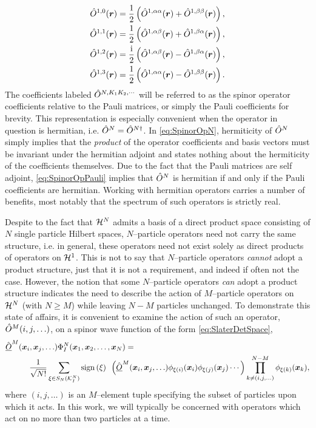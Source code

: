 \begin{subequations}
\begin{align}
&\hat{O}^{1,0}(\boldsymbol{r}) = \frac{1}{2} \left( \hat{O}^{1,\alpha\alpha}(\boldsymbol{r}) + \hat{O}^{1,\beta\beta}(\boldsymbol{r}) \right),\\
&\hat{O}^{1,1}(\boldsymbol{r}) = \frac{1}{2} \left( \hat{O}^{1,\alpha\beta}(\boldsymbol{r}) + \hat{O}^{1,\beta\alpha}(\boldsymbol{r}) \right),\\
&\hat{O}^{1,2}(\boldsymbol{r}) = \frac{\mathrm i}{2} \left( \hat{O}^{1,\alpha\beta}(\boldsymbol{r}) - \hat{O}^{1,\beta\alpha}(\boldsymbol{r}) \right),\\
&\hat{O}^{1,3}(\boldsymbol{r}) = \frac{1}{2} \left( \hat{O}^{1,\alpha\alpha}(\boldsymbol{r}) - \hat{O}^{1,\beta\beta}(\boldsymbol{r}) \right).
\end{align}
\end{subequations}
The coefficients labeled $\hat{O}^{N,K_1K_2,\cdots}$ will be referred to as the spinor operator coefficients relative
to the Pauli matrices, or simply the Pauli coefficients for brevity.
This representation is especially convenient when the operator in question is hermitian, i.e. $\hat{O}^N = \hat{O}^{N\dagger}$.
In \cref{eq:SpinorOpN}, hermiticity of $\hat{O}^N$ simply implies that the \emph{product} of the operator coefficients and 
basis vectors must be invariant under the hermitian adjoint and states nothing about the hermiticity of the coefficients
themselves. Due to the fact that the Pauli matrices are self adjoint, \cref{eq:SpinorOpPauli} implies that $\hat{O}^N$
is hermitian if and only if the Pauli coefficients are hermitian. Working with hermitian operators
carries a number of benefits, most notably that the spectrum of such operators is strictly real.


Despite to the fact that $\mathcal{H}^N$ admits a basis of a direct product space consisting of $N$ single particle
Hilbert spaces, $N$--particle operators need not carry the same structure, 
i.e. in general, these operators need not exist solely as direct products of operators on $\mathcal{H}^1$. This is not to say
that $N$--particle operators \emph{cannot} adopt a product structure, just that it is not a requirement, and indeed
if often not the case. However, the notion that some $N$--particle operators \emph{can} adopt a product structure indicates the need
to describe the action of $M$--particle operators on $\mathcal{H}^N$ (with $N \geq M$) while leaving $N-M$ particles unchanged.
To demonstrate this state of affairs, it is convenient to examine the action of such an operator, $\hat{O}^M(i,j,\ldots)$, on a 
spinor wave function of the form \cref{eq:SlaterDetSpace},
\begin{align}
  \label{eq:MOpSpace}
  &\hat{\underline{O}}^M(\boldsymbol{x}_i,\boldsymbol{x}_j,\ldots) \Phi_I^N(\boldsymbol{x}_1,\boldsymbol{x}_2,\ldots,\boldsymbol{x}_N) = \nonumber \\ &\qquad \quad
    \frac{1}{\sqrt{N!}} \sum_{\xi \in S_N(\mathcal{K}^N_I)} \mathrm{sign}\left( \xi \right) \text{ } 
    \left(\hat{\underline{O}}^M(\boldsymbol{x}_i,\boldsymbol{x}_j,\ldots) \phi_{\xi(i)}(\boldsymbol{x}_i)\phi_{\xi(j)}(\boldsymbol{x}_j)\cdots\right)
    \prod_{k \neq (i,j,\ldots) }^{N-M} \phi_{\xi(k)}(\boldsymbol{x}_k),
\end{align}
where $(i,j,\ldots)$ is an $M$--element tuple specifying the subset of particles upon which it acts.
In this work, we will typically be concerned with operators which act on no more than two particles at a time.

